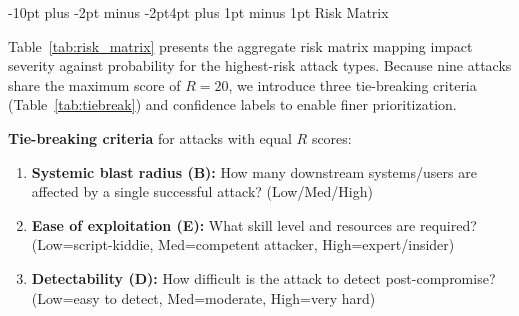 \documentclass[conference]{IEEEtran}
\makeatletter
\renewcommand{\section}{\@startsection{section}{1}{\z@}%
  {-10pt plus -2pt minus -2pt}{4pt plus 1pt minus 1pt}%
  {\normalfont\large\bfseries\sffamily\color{accentdark}}}
\makeatother
\begin{document}
\section{Risk Matrix}\label{sec:risk_matrix}


Table~\ref{tab:risk_matrix} presents the aggregate risk matrix mapping impact severity against probability for the highest-risk attack types. Because nine attacks share the maximum score of $R{=}20$, we introduce three tie-breaking criteria (Table~\ref{tab:tiebreak}) and confidence labels to enable finer prioritization.

\textbf{Tie-breaking criteria} for attacks with equal $R$ scores:
\begin{enumerate}[leftmargin=*, nosep]
  \item \textbf{Systemic blast radius (B):} How many downstream systems/users are affected by a single successful attack? (Low/Med/High)
  \item \textbf{Ease of exploitation (E):} What skill level and resources are required? (Low=script-kiddie, Med=competent attacker, High=expert/insider)
  \item \textbf{Detectability (D):} How difficult is the attack to detect post-compromise? (Low=easy to detect, Med=moderate, High=very hard)
\end{enumerate}
\end{document}
